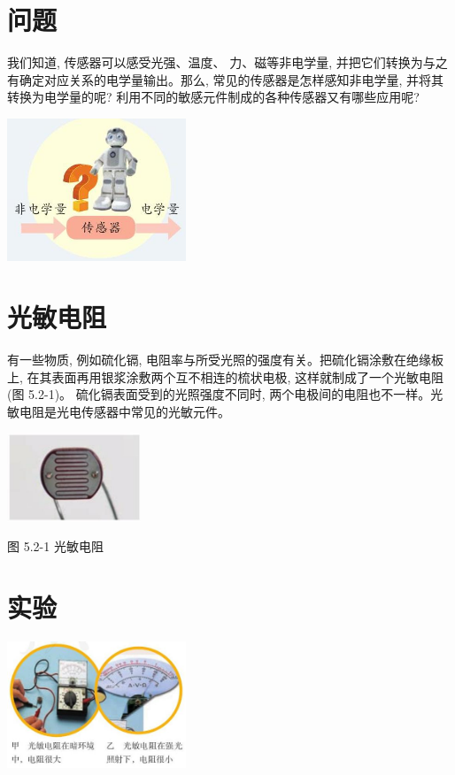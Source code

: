 \documentclass[10pt]{article}
\begin{document}
\section*{问题}

我们知道, 传感器可以感受光强、温度、 力、磁等非电学量, 并把它们转换为与之有确定对应关系的电学量输出。那么, 常见的传感器是怎样感知非电学量, 并将其转换为电学量的呢? 利用不同的敏感元件制成的各种传感器又有哪些应用呢?

\begin{center}
\includegraphics[max width=0.4\textwidth]{images/01910e72-c5b7-7ed5-a6d4-fb3a5faefc32_102_768342.jpg}
\end{center}

\section*{光敏电阻}

有一些物质, 例如硫化镉, 电阻率与所受光照的强度有关。把硫化镉涂敷在绝缘板上, 在其表面再用银浆涂敷两个互不相连的梳状电极, 这样就制成了一个光敏电阻 (图 5.2-1)。 硫化镉表面受到的光照强度不同时, 两个电极间的电阻也不一样。光敏电阻是光电传感器中常见的光敏元件。

\begin{center}
\includegraphics[max width=0.3\textwidth]{images/01910e72-c5b7-7ed5-a6d4-fb3a5faefc32_102_275743.jpg}
\end{center}

图 5.2-1 光敏电阻

\section*{实验}

\begin{center}
\includegraphics[max width=0.4\textwidth]{images/01910e72-c5b7-7ed5-a6d4-fb3a5faefc32_102_150909.jpg}
\end{center}
\end{document}
